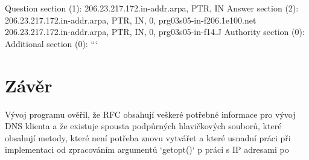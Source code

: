 \documentclass[a4paper,11pt]{article}
\begin{document}
Question section (1):
  206.23.217.172.in-addr.arpa, PTR, IN
Answer section (2):
  206.23.217.172.in-addr.arpa, PTR, IN, 0, prg03s05-in-f206.1e100.net
  206.23.217.172.in-addr.arpa, PTR, IN, 0, prg03s05-in-f14.J
Authority section (0):
Additional section (0):
```

\section{Závěr}

Vývoj programu ověřil, že RFC obsahují veškeré potřebné informace pro vývoj DNS klienta a že existuje spousta podpůrných hlavičkových souborů, které obsahují metody, které není potřeba znovu vytvářet a které usnadní práci při implementaci od zpracováním argumentů `getopt()` p práci s IP adresami po  

\newpage




\end{document}
